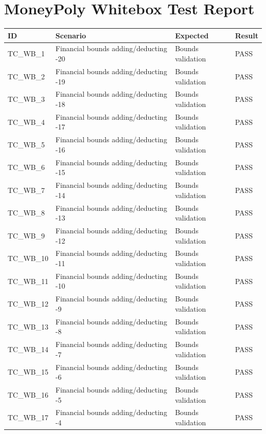 \documentclass{article}
\begin{document}
\section*{MoneyPoly Whitebox Test Report}

\begin{longtable}{|p{2cm}|p{8cm}|p{3cm}|p{2cm}|}
\hline
\textbf{ID} & \textbf{Scenario} & \textbf{Expected} & \textbf{Result} \\
\hline
\endhead
TC\_WB\_1 & Financial bounds adding/deducting -20 & Bounds validation & PASS \\
\hline
TC\_WB\_2 & Financial bounds adding/deducting -19 & Bounds validation & PASS \\
\hline
TC\_WB\_3 & Financial bounds adding/deducting -18 & Bounds validation & PASS \\
\hline
TC\_WB\_4 & Financial bounds adding/deducting -17 & Bounds validation & PASS \\
\hline
TC\_WB\_5 & Financial bounds adding/deducting -16 & Bounds validation & PASS \\
\hline
TC\_WB\_6 & Financial bounds adding/deducting -15 & Bounds validation & PASS \\
\hline
TC\_WB\_7 & Financial bounds adding/deducting -14 & Bounds validation & PASS \\
\hline
TC\_WB\_8 & Financial bounds adding/deducting -13 & Bounds validation & PASS \\
\hline
TC\_WB\_9 & Financial bounds adding/deducting -12 & Bounds validation & PASS \\
\hline
TC\_WB\_10 & Financial bounds adding/deducting -11 & Bounds validation & PASS \\
\hline
TC\_WB\_11 & Financial bounds adding/deducting -10 & Bounds validation & PASS \\
\hline
TC\_WB\_12 & Financial bounds adding/deducting -9 & Bounds validation & PASS \\
\hline
TC\_WB\_13 & Financial bounds adding/deducting -8 & Bounds validation & PASS \\
\hline
TC\_WB\_14 & Financial bounds adding/deducting -7 & Bounds validation & PASS \\
\hline
TC\_WB\_15 & Financial bounds adding/deducting -6 & Bounds validation & PASS \\
\hline
TC\_WB\_16 & Financial bounds adding/deducting -5 & Bounds validation & PASS \\
\hline
TC\_WB\_17 & Financial bounds adding/deducting -4 & Bounds validation & PASS \\

\end{longtable}
\end{document}
